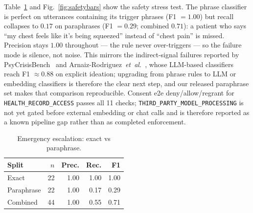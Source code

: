 \documentclass[conference]{IEEEtran}
\begin{document}
Table~\ref{tab:safety} and Fig.~\ref{fig:safetybars} show the safety stress test.
The phrase classifier is perfect on utterances containing its trigger phrases (F1 $= 1.00$) but recall collapses to $0.17$ on paraphrases (F1 $= 0.29$; combined $0.71$): a patient who says ``my chest feels like it's being squeezed'' instead of ``chest pain'' is missed.
Precision stays $1.00$ throughout --- the rule never over-triggers --- so the failure mode is silence, not noise.
This mirrors the indirect-signal failures reported by PsyCrisisBench~\cite{deng2025psycrisisbench} and Arnaiz-Rodriguez~\textit{et~al.}~\cite{arnaiz2026crisis}, whose LLM-based classifiers reach F1 $\approx 0.88$ on explicit ideation; upgrading from phrase rules to LLM or embedding classifiers is therefore the clear next step, and our released paraphrase set makes that comparison reproducible.
Consent e2e deny/allow/regrant for \texttt{HEALTH\_RECORD\_ACCESS} passes all 11 checks; \texttt{THIRD\_PARTY\_MODEL\_PROCESSING} is not yet gated before external embedding or chat calls and is therefore reported as a known pipeline gap rather than as completed enforcement.

\begin{table}[!t]
\centering
\caption{Emergency escalation: exact vs paraphrase.}
\label{tab:safety}
\begin{tabular}{@{}lrrrr@{}}
\toprule
Split & $n$ & Prec. & Rec. & F1 \\
\midrule
Exact & 22 & 1.00 & 1.00 & 1.00 \\
Paraphrase & 22 & 1.00 & 0.17 & 0.29 \\
Combined & 44 & 1.00 & 0.55 & 0.71 \\
\bottomrule
\end{tabular}
\end{table}
\end{document}
